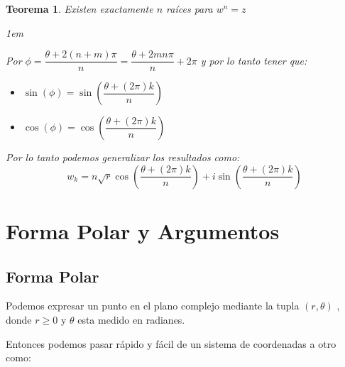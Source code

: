 \documentclass[12pt, fleqn]{report}                             %
\newenvironment{SmallIndentation}[1][0.75em]                    %
    {\begin{adjustwidth}{#1}{}\begin{footnotesize}}                 %
    {\end{footnotesize}\end{adjustwidth}}                           %
\newtheorem{Theorem}{Teorema}[section]                          %
\newcommand{\Wrap}[1]{\left( #1 \right)}                        %
\newcommand{\Cos}[1]{\cos\Wrap{#1}}
\newcommand{\Sin}[1]{\sin\Wrap{#1}}
\newcommand \Cis[1]  {\Cos{#1} + i \Sin{#1}}                    %
\begin{document}
\begin{Theorem}{Existen exactamente $n$ raíces para $w^n = z$}
\begin{SmallIndentation}[1em]
\begin{itemize}
                                Por $\phi = \dfrac{\theta + 2(n + m) \pi}{n} = \dfrac{\theta + 2mn\pi}{n} + 2\pi$
                                y por lo tanto tener que:
                                \begin{itemize}
                                    \item $\Sin{\phi} = \Sin{\dfrac{\theta + (2\pi) k}{n}}$
                                    \item $\Cos{\phi} = \Cos{\dfrac{\theta + (2\pi) k}{n}}$
                                \end{itemize}

                        \end{itemize}


                        Por lo tanto podemos generalizar los resultados como:
                        \begin{equation}
                            w_k = n\sqrt{r} \Cis{\dfrac{\theta + (2\pi) k}{n}}
                        \end{equation}


                    \end{SmallIndentation}
            \end{Theorem}



    \chapter{Forma Polar y Argumentos}

        \clearpage
        \section{Forma Polar}
            
            Podemos expresar un punto en el plano complejo mediante la tupla $(r, \theta)$ , donde
            $r \geq 0$ y $\theta$ esta medido en radianes.

            Entonces podemos pasar rápido y fácil de un sistema de coordenadas a otro como:
\end{document}
